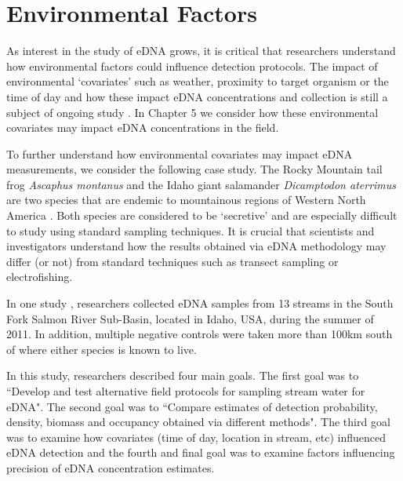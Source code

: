 \section{Environmental Factors}


As interest in the study of eDNA grows, it is critical that researchers understand how environmental factors could influence detection protocols. The impact of environmental `covariates' such as weather, proximity to target organism or the time of day and how these impact eDNA concentrations and collection is still a subject of ongoing study \citep{cupwater}. In Chapter 5 we consider how these environmental covariates may impact eDNA concentrations in the field.
\vspace{5mm}



To further understand how environmental covariates may impact eDNA measurements, we consider the following case study. The Rocky Mountain tail frog \textit{Ascaphus montanus} and the Idaho giant salamander \textit{Dicamptodon aterrimus} are two species that are endemic to mountainous regions of Western North America \citep{amphibiandecline}. Both species are considered to be `secretive' and are especially difficult to study using standard sampling techniques. It is crucial that scientists and investigators understand how the results obtained via eDNA methodology may differ (or not) from standard techniques such as transect sampling or electrofishing.

\vspace{5mm}

In one study \citep{occupancyamphibians}, researchers collected eDNA samples from 13 streams in the South Fork Salmon River Sub-Basin, located in Idaho, USA, during the summer of 2011. In addition, multiple negative controls were taken more than 100km south of where either species is known to live.

\vspace{5mm}

In this study, researchers described four main goals. The first goal was to ``Develop and test alternative field protocols for sampling stream water for eDNA". The second goal was to ``Compare estimates of detection probability, density, biomass and occupancy obtained via different methods". The third goal was to examine how covariates (time of day, location in stream, etc) influenced eDNA detection and the fourth and final goal was to examine factors influencing precision of eDNA concentration estimates. 

